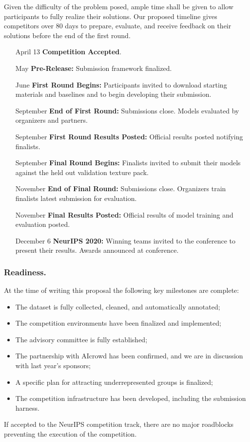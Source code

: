 Given the difficulty of the problem posed, ample time shall be given to allow participants to fully realize their solutions.
Our proposed timeline gives competitors over 80 days to prepare, evaluate, and receive feedback on their solutions before the end of the first round.
\begin{itemize}
	\item [April 13] \textbf{Competition Accepted}. 
	\item [May] \textbf{Pre-Release:} Submission framework finalized. 
	\item [June] \textbf{First Round Begins:} Participants invited to download starting materials and baselines and to begin developing their submission.
	\item [September] \textbf{End of First Round:} Submissions close. Models evaluated by organizers and partners.
	\item [September] \textbf{First Round Results Posted:} Official results posted notifying finalists.
	\item [September] \textbf{Final Round Begins:} Finalists invited to submit their models against the held out validation texture pack.
	\item [November] \textbf{End of Final Round:} Submissions close. Organizers train finalists latest submission for evaluation.
	\item [November] \textbf{Final Results Posted:} Official results of model training and evaluation posted.
	\item [December 6] \textbf{NeurIPS 2020:} Winning teams invited to the conference to present their results. Awards announced at conference.
\end{itemize}

\subsubsection{Readiness.} At the time of writing this proposal the following key milestones are complete: 
\begin{itemize}
    \item The dataset is fully collected, cleaned, and automatically annotated;
    \item The competition environments have been finalized and implemented;
    \item The advisory committee is fully established; 
    \item The partnership with AIcrowd has been confirmed, and we are in discussion with last year's sponsors;
    \item A specific plan for attracting underrepresented groups is finalized; 
    \item The competition infrastructure has been developed, including the submission harness. 
\end{itemize}
If accepted to the NeurIPS competition track, there are no major roadblocks preventing the execution of the competition.


